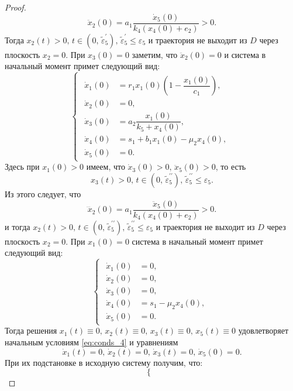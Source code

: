 \documentclass[14pt,a4paper]{extarticle}
\begin{document}
\begin{proof}
		\[\ddot{x}_2(0) = a_1\dfrac{\dot{x}_5(0)}{k_4(x_4(0)+e_2)} > 0.\]
		Тогда $x_2(t)>0,\, t\in(0,\, \tilde{\varepsilon}^{\prime}_5),\,\tilde{\varepsilon}^{\prime}_5\le\varepsilon_5$ и траектория не выходит из $D$ через плоскость $x_2=0$. При $x_3(0)=0$ заметим, что $\ddot{x}_2(0)=0$ и система в начальный момент примет следующий вид:
		\begin{equation*}
			\begin{cases}
				\begin{aligned}
					\dot{x}_1(0) &= r_1x_1(0)\left(1-\dfrac{x_1(0)}{c_1}\right),\\
					\dot{x}_2(0) &= 0,\\
					\dot{x}_3(0) &= a_2\dfrac{x_1(0)}{k_5+x_4(0)},\\
					\dot{x}_4(0) &= s_1 + b_1x_1(0)-\mu_2x_4(0),\\
					\dot{x}_5(0) &= 0.
				\end{aligned}
			\end{cases}
		\end{equation*} 
		Здесь при $x_1(0)>0$ имеем, что $\dot{x}_3(0)>0,\,\ddot{x}_5(0)>0$, то есть 
		\[x_3(t)>0,\, t\in(0,\, \tilde{\varepsilon}^{\prime\prime}_5),\,\tilde{\varepsilon}^{\prime\prime}_5\le\varepsilon_5.\]
		Из этого следует, что
		\[\dddot{x}_2(0) = a_1\dfrac{\ddot{x}_5(0)}{k_4(x_4(0)+e_2)}>0.\]
		и тогда $x_2(t)>0,\, t\in(0,\, \tilde{\varepsilon}^{\prime\prime}_5),\,\tilde{\varepsilon}^{\prime\prime}_5\le\varepsilon_5$ и траектория не выходит из $D$ через плоскость $x_2=0$. При $x_1(0)=0$ система в начальный момент примет следующий вид:
		\begin{equation*}
			\begin{cases}
				\begin{aligned}
					\dot{x}_1(0) &= 0,\\
					\dot{x}_2(0) &= 0,\\
					\dot{x}_3(0) &= 0,\\
					\dot{x}_4(0) &= s_1 - \mu_2x_4(0),\\
					\dot{x}_5(0) &= 0.
				\end{aligned}
			\end{cases}
		\end{equation*}
		Тогда решения $x_1(t)\equiv0,\, x_2(t)\equiv0,\, x_3(t)\equiv0,\, x_5(t)\equiv0$ удовлетворяет начальным условиям \ref{eq:conds_4} и уравнениям 
		\[\dot{x}_1(t)=0,\, \dot{x}_2(t)=0,\, \dot{x}_3(t)=0,\, \dot{x}_5(0)=0.\] 
		При их подстановке в исходную систему получим, что:
		\begin{equation*}
			\begin{cases}

\end{cases}
\end{equation*}
\end{proof}
\end{document}
